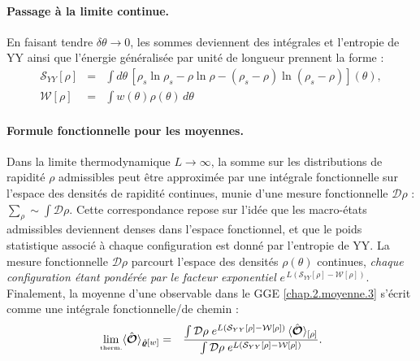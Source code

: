 \paragraph{Passage à la limite continue.}
En faisant tendre $\delta\theta \to 0$, les sommes deviennent des intégrales 
et l'entropie de \gls{YY} ainsi que l’énergie généralisée par unité de longueur prennent la forme :
\begin{eqnarray}
	\mathcal{S}_{YY}[\rho] & = & \int d \theta  \, [ \rho_s\ln \rho_s - \rho \ln \rho - ( \rho_s - \rho ) \ln ( \rho_s - \rho ) ] (\theta) , \label{chap.2.entropi.int}\\
	\mathcal{W}[\rho] & = & \int   w(\theta) \rho(\theta) \, d \theta \label{chap.2.W.int}		
\end{eqnarray}

\paragraph{Formule fonctionnelle pour les moyennes.}

Dans la limite thermodynamique $L \to \infty$, la somme sur les distributions de rapidité $\rho$ admissibles peut être approximée par une intégrale fonctionnelle sur l’espace des densités de rapidité continues, munie d’une mesure fonctionnelle $\mathcal{D}\rho$ : 
\(
\sum_{\rho } \sim \int \mathcal{D} \rho .
\)
Cette correspondance repose sur l’idée que les macro-états admissibles deviennent denses dans l’espace fonctionnel, et que le poids statistique associé à chaque configuration est donné par l’entropie de \gls{YY}.
La mesure fonctionnelle $\mathcal{D}\rho$ parcourt l’espace des densités
$\rho(\theta)$ continues, \emph{chaque configuration étant pondérée par le
facteur exponentiel}
\(
e^{\,L(\mathcal{S}_{YY}[\rho]-\mathcal{W}[\rho])}.
\)
Finalement, la moyenne d'une observable dans le \gls{GGE} \eqref{chap.2.moyenne.3} s’écrit comme une intégrale fonctionnelle/de chemin :
\begin{eqnarray}
	\underset{\mbox{\tiny therm.}}{\lim} \langle \hat{\bm{\mathcal{O}}} \rangle_{\hat{\bm{\varrho}}[w]} & = & \frac{\int \mathcal{D} \rho \; e^{L (\mathcal{S}_{YY}[\rho] - \mathcal{W}[\rho])} \, \langle\hat{\bm{\mathcal{O}}}\rangle_{[\rho]}}{\int \mathcal{D} \rho \; e^{L (\mathcal{S}_{YY}[\rho] - \mathcal{W}[\rho])}}. \label{chap:TBA:eq:ensemble_average}
\end{eqnarray}


